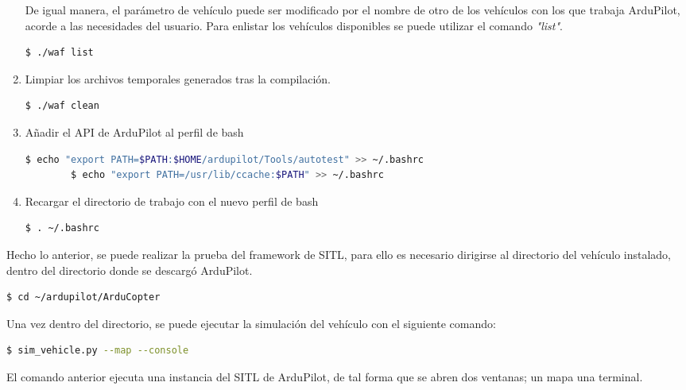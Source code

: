 \begin{enumerate}
    De igual manera, el parámetro de vehículo puede ser modificado por el nombre de otro de los vehículos con los que trabaja ArduPilot, acorde a las necesidades del usuario. Para enlistar los vehículos disponibles se puede utilizar el comando \textit{"list"}.
    
    \begin{lstlisting}[language = bash]
        $ ./waf list
    \end{lstlisting}

    \item Limpiar los archivos temporales generados tras la compilación.
    
    \begin{lstlisting}[language = bash]
        $ ./waf clean
    \end{lstlisting}

    \item Añadir el API de ArduPilot al perfil de bash
    
    \begin{lstlisting}[language = bash]
        $ echo "export PATH=$PATH:$HOME/ardupilot/Tools/autotest" >> ~/.bashrc
        $ echo "export PATH=/usr/lib/ccache:$PATH" >> ~/.bashrc 
    \end{lstlisting}  

    \item Recargar el directorio de trabajo con el nuevo perfil de bash
    
    \begin{lstlisting}[language = bash]
        $ . ~/.bashrc
    \end{lstlisting}  

\end{enumerate}

Hecho lo anterior, se puede realizar la prueba del  framework de SITL, para ello es necesario dirigirse al directorio del vehículo instalado, dentro del directorio donde se descargó ArduPilot. 

\begin{lstlisting}[language = bash]
    $ cd ~/ardupilot/ArduCopter
\end{lstlisting}  

Una vez dentro del directorio, se puede ejecutar la simulación del vehículo con el siguiente comando:

\begin{lstlisting}[language = bash]
    $ sim_vehicle.py --map --console
\end{lstlisting}  


El comando anterior ejecuta una instancia del SITL de ArduPilot, de tal forma que se abren dos ventanas; un mapa una terminal.

